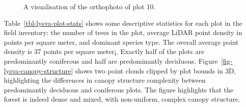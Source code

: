 \begin{figure}
\caption{\label{fig-example-ortho}A visualisation of the orthophoto of
plot 10.}
\end{figure}

Table~\ref{tbl-lysva-plot-stats} shows some descriptive statistics for each plot in the field inventory: the number of trees in the plot, average LiDAR point density in points per square meter, and dominant species type.
The overall average point density is 37 points per square meter¡.
Exactly half of the plots are predominantly coniferous and half are predominantly deciduous.
Figure~\ref{fig-lysva-canopy-structure} shows two point clouds clipped by plot bounds in 3D, highlighting the differences in canopy structure complexity between predominantly deciduous and coniferous plots.
The figure highlights that the forest is indeed dense and mixed, with non-uniform, complex canopy structure.

